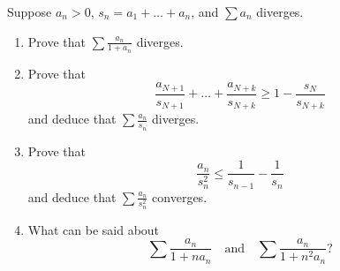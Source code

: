 \documentclass[12 pt, letterpaper]{hmcpset}
\begin{document}
\pagebreak

\begin{problem}
	Suppose $a_{n} > 0$, $s_{n} = a_{1} + \dots + a_{n}$, and $\sum a_{n}$ diverges.
	\begin{enumerate}
		\item Prove that $\sum \frac{a_{n}}{1 + a_{n}}$ diverges.
		\item Prove that
			\[
				\frac{a_{N + 1}}{s_{N + 1}} + \dots + \frac{a_{N + k}}{s_{N + k}} \ge 1 - \frac{s_{N}}{s_{N + k}}
			\]
			and deduce that $\sum \frac{a_{n}}{s_{n}}$ diverges.
		\item Prove that
			\[
				\frac{a_{n}}{s_{n}^{2}} \le \frac{1}{s_{n - 1}} - \frac{1}{s_{n}}
			\]
			and deduce that $\sum \frac{a_{n}}{s_{n}^{2}}$ converges.
		\item What can be said about
			\[
				\sum \frac{a_{n}}{1 + n a_{n}} \quad \text{and} \quad \sum \frac{a_{n}}{1 + n^{2} a_{n}}?
			\]
	\end{enumerate}
\end{problem}
\end{document}
